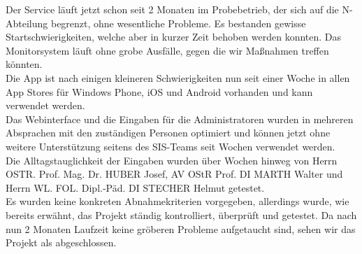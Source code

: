 
Der Service läuft jetzt schon seit 2 Monaten im Probebetrieb, der sich auf die N-Abteilung begrenzt, ohne wesentliche Probleme. Es bestanden gewisse Startschwierigkeiten, welche aber in kurzer Zeit behoben werden konnten. Das Monitorsystem läuft ohne grobe Ausfälle, gegen die wir Maßnahmen treffen könnten.\\
Die App ist nach einigen kleineren Schwierigkeiten nun seit einer Woche in allen App Stores für Windows Phone, iOS und Android vorhanden und kann verwendet werden.\\
Das Webinterface und die Eingaben für die Administratoren wurden in mehreren Absprachen mit den zuständigen Personen optimiert und können jetzt ohne weitere Unterstützung seitens des SIS-Teams seit Wochen verwendet werden.\\
Die Alltagstauglichkeit der Eingaben wurden über Wochen hinweg von Herrn OSTR. Prof. Mag. Dr. HUBER Josef, AV OStR Prof. DI MARTH Walter und Herrn WL. FOL. Dipl.-Päd. DI STECHER Helmut getestet.\\
Es wurden keine konkreten Abnahmekriterien vorgegeben, allerdings wurde, wie bereits erwähnt, das Projekt ständig kontrolliert, überprüft und getestet. Da nach nun 2 Monaten Laufzeit keine gröberen Probleme aufgetaucht sind, sehen wir das Projekt als abgeschlossen.
